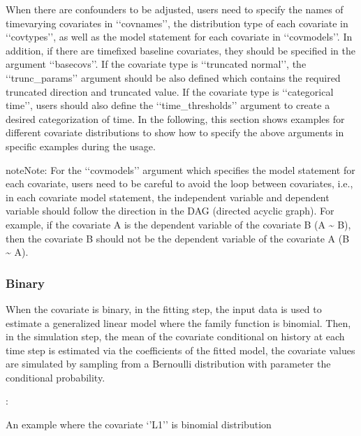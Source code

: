 \documentclass[letterpaper,10pt,english]{sphinxmanual}
\begin{document}
\sphinxAtStartPar
When there are confounders to be adjusted, users need to specify the names of time\sphinxhyphen{}varying covariates in ‘‘covnames’’, the distribution type
of each covariate in ‘‘covtypes’’, as well as the model statement for each covariate in ‘‘covmodels’’.
In addition, if there are time\sphinxhyphen{}fixed baseline covariates, they should be specified in the argument ‘‘basecovs’’.
If the covariate type is ‘‘truncated normal’’, the ‘‘trunc\_params’’ argument should be also defined which contains
the required truncated direction and truncated value. If the covariate type is ‘‘categorical time’’, users should
also define the ‘‘time\_thresholds’’ argument to create a desired categorization of time.
In the following, this section shows examples for different covariate distributions to show how to specify the above arguments
in specific examples during the usage.

\begin{sphinxadmonition}{note}{Note:}
\sphinxAtStartPar
For the ‘‘covmodels’’ argument which specifies the model statement for each covariate, users need to be careful to
avoid the loop between covariates, i.e., in each covariate model statement, the independent variable and dependent
variable should follow the direction in the DAG (directed acyclic graph). For example, if the covariate A is the
dependent variable of the covariate B (A \textasciitilde{} B), then the covariate B should not be the dependent variable of the
covariate A (B \textasciitilde{} A).
\end{sphinxadmonition}


\subsubsection{Binary}
\label{\detokenize{Specifications/Covariate model:binary}}
\sphinxAtStartPar
When the covariate is binary, in the fitting step, the input data is used to estimate a generalized linear model where
the family function is binomial. Then, in the simulation step, the mean of the covariate conditional on history
at each time step is estimated via the coefficients of the fitted model, the covariate values are simulated
by sampling from a Bernoulli distribution with parameter the conditional probability.

\sphinxAtStartPar
{}:

\sphinxAtStartPar
An example where the covariate ‘’L1’’ is binomial distribution
\end{document}

